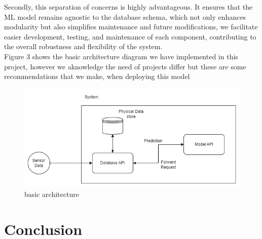 \documentclass{article}
\begin{document}
Secondly, this separation of concerns is highly advantageous. It ensures that the ML model remains agnostic to the database schema, which not only enhances modularity but also simplifies maintenance and future modifications, we facilitate easier development, testing, and maintenance of each component, contributing to the overall robustness and flexibility of the system. \\

Figure 3 shows the basic architecture diagram we have implemented in this project, however we aknowledge the need of projects differ but these are some recommendations that we make, when deploying this model

\begin{figure}
    \centering
    \includegraphics[width=1\linewidth]{architecture_basic.png}
    \caption{basic architecture}
    \label{fig:architecture}
\end{figure}

\section{Conclusion}
\end{document}
